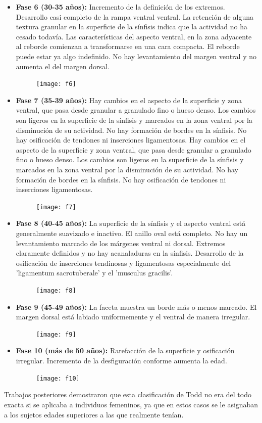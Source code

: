 \documentclass[a4paper,11pt]{article}
\begin{document}
\begin{itemize}
\begin{figure}[h!]
\end{figure}
\item {\bf Fase 6 (30-35 años):} Incremento de la definición de los extremos. Desarrollo casi completo de la rampa ventral ventral. La retención de alguna textura granular en la superficie de la sínfisis indica que la actividad no ha cesado todavía. Las características del aspecto ventral, en la zona adyacente al reborde comienzan a transformarse en una cara compacta. El reborde puede estar ya algo indefinido. No hay levantamiento del margen ventral y no aumenta el del margen dorsal.
\begin{figure}[h!]
\centering
\texttt{[image: f6]}
\end{figure}
\item {\bf Fase 7 (35-39 años):} Hay cambios en el aspecto de la superficie y zona ventral, que pasa desde granular a granulado fino o hueso denso. Los cambios son ligeros en la superficie de la sínfisis y marcados en la zona ventral por la disminución de su actividad. No hay formación de bordes en la sínfisis. No hay osificación de tendones ni inserciones ligamentosas. Hay cambios en el aspecto de la superficie y zona ventral, que pasa desde granular a granulado fino o hueso denso. Los cambios son ligeros en la superficie de la sínfisis y marcados en la zona ventral por la disminución de su actividad. No hay formación de bordes en la sínfisis. No hay osificación de tendones ni inserciones ligamentosas.
\begin{figure}[h!]
\centering
\texttt{[image: f7]}
\end{figure}
\item {\bf Fase 8 (40-45 años):} La superficie de la sínfisis y el aspecto ventral está generalmente suavizado e inactivo. El anillo oval está completo. No hay un levantamiento marcado de los márgenes ventral ni dorsal. Extremos claramente definidos y no hay acanaladuras en la sínfisis. Desarrollo de la osificación de inserciones tendinosas y ligamentosas especialmente del 'ligamentum sacrotuberale' y el 'musculus gracilis'.
\begin{figure}[h!]
\centering
\texttt{[image: f8]}
\end{figure}
\item {\bf Fase 9 (45-49 años):} La faceta muestra un borde más o menos marcado. El margen dorsal está labiado uniformemente y el ventral de manera irregular.
\begin{figure}[h!]
\centering
\texttt{[image: f9]}
\end{figure}
\item {\bf Fase 10 (más de 50 años):} Rarefacción de la superficie y osificación irregular. Incremento de la desfiguración conforme aumenta la edad.
\begin{figure}[h!]
\centering
\texttt{[image: f10]}
\end{figure}
\end{itemize}
Trabajos posteriores demostraron que esta clasificación de Todd no era del todo exacta si se aplicaba a individuos femeninos, ya que en estos casos se le asignaban a los sujetos edades superiores a las que realmente tenían.
\end{document}
